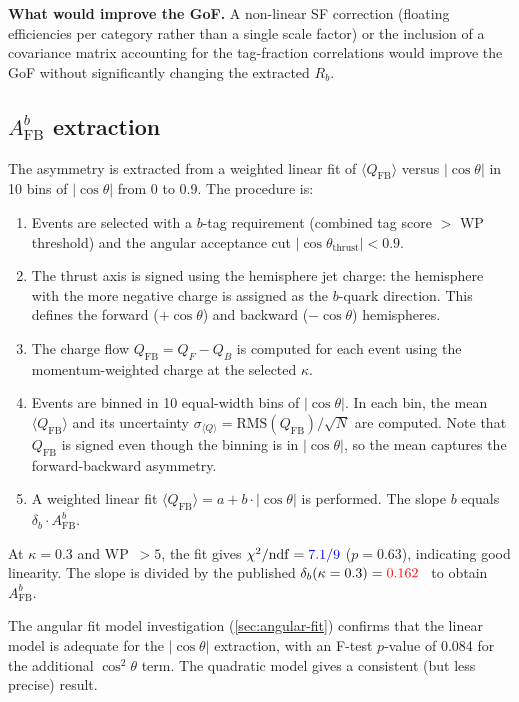 \documentclass[11pt,a4paper]{article}
\newcommand{\measured}[1]{\textcolor{blue}{#1}}
\newcommand{\external}[1]{\textcolor{red}{#1}}
\begin{document}
\textbf{What would improve the GoF.}
A non-linear SF correction (floating efficiencies per category rather
than a single scale factor) or the inclusion of a covariance matrix
accounting for the tag-fraction correlations would improve the GoF
without significantly changing the extracted $R_b$.

\subsection{$A_\mathrm{FB}^b$ extraction}

The asymmetry is extracted from a weighted linear fit of
$\langle Q_\mathrm{FB} \rangle$ versus $|\cos\theta|$ in 10 bins of
$|\cos\theta|$ from 0 to 0.9.  The procedure is:

\begin{enumerate}
\item Events are selected with a $b$-tag requirement (combined tag
  score $>$ WP threshold) and the angular acceptance cut
  $|\cos\theta_\mathrm{thrust}| < 0.9$.
\item The thrust axis is signed using the hemisphere jet charge: the
  hemisphere with the more negative charge is assigned as the $b$-quark
  direction.  This defines the forward ($+\cos\theta$) and backward
  ($-\cos\theta$) hemispheres.
\item The charge flow $Q_\mathrm{FB} = Q_F - Q_B$ is computed for each
  event using the momentum-weighted charge at the selected $\kappa$.
\item Events are binned in 10 equal-width bins of $|\cos\theta|$.  In
  each bin, the mean $\langle Q_\mathrm{FB} \rangle$ and its uncertainty
  $\sigma_{\langle Q \rangle} = \mathrm{RMS}(Q_\mathrm{FB}) / \sqrt{N}$
  are computed.  Note that $Q_\mathrm{FB}$ is signed even though the
  binning is in $|\cos\theta|$, so the mean captures the forward-backward
  asymmetry.
\item A weighted linear fit $\langle Q_\mathrm{FB} \rangle = a + b \cdot
  |\cos\theta|$ is performed.  The slope $b$ equals
  $\delta_b \cdot A_\mathrm{FB}^b$.
\end{enumerate}

At $\kappa = 0.3$ and WP~$> 5$, the fit gives
$\chi^2/\mathrm{ndf} = \measured{7.1/9}$ ($p = 0.63$), indicating good
linearity.  The slope is divided by the published
$\delta_b(\kappa = 0.3) = \external{0.162}$~\cite{LEP:EWWG:2005} to
obtain $A_\mathrm{FB}^b$.

The angular fit model investigation (\cref{sec:angular-fit}) confirms
that the linear model is adequate for the $|\cos\theta|$ extraction,
with an F-test $p$-value of 0.084 for the additional $\cos^2\theta$ term.
The quadratic model gives a consistent (but less precise) result.
\end{document}
